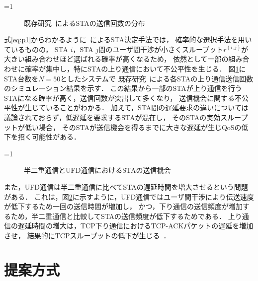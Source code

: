 \documentclass[master]{kuisthesis}		%
\newcommand{\sij}{(i,j)}
\newcommand{\rij}{r^{\sij}}
\newcounter{flagFig}
\begin{document}
			\par
			\ifnum\value{flagFig}=1 {\begin{figure}[htbp]
				\centering
				\caption{既存研究~\cite{promac}によるSTAの送信回数の分布}
				\label{fig:numtx}
			\end{figure}}\fi
			式\eqref{eq:p1}からわかるように~\cite{promac}によるSTA決定手法では，
			確率的な選択手法を用いているものの，
			STA $i$，STA $j$間のユーザ間干渉が小さくスループット$\rij$が大きい組み合わせほど選ばれる確率が高くなるため，
			依然として一部の組み合わせに確率が集中し，特にSTAの上り通信において不公平性を生じる．
			図\ref{fig:numtx}にSTA台数を$N=50$としたシステムで
			既存研究~\cite{promac}による各STAの上り通信送信回数のシミュレーション結果を示す．
			この結果から一部のSTAが上り通信を行うSTAになる確率が高く，送信回数が突出して多くなり，
			送信機会に関する不公平性が生じていることがわかる．
			加えて，STA間の遅延要求の違いについては議論されておらず，低遅延を要求するSTAが混在し，
			そのSTAの実効スループットが低い場合，
			そのSTAが送信機会を得るまでに大きな遅延が生じQoSの低下を招く可能性がある．
			\par
			\ifnum\value{flagFig}=1 {\begin{figure}[htbp]
				\centering
				\caption{半二重通信とUFD通信におけるSTAの送信機会}
				\label{fig:problem}
			\end{figure}}\fi
			また，UFD通信は半二重通信に比べてSTAの遅延時間を増大させるという問題がある．
			これは，図\ref{fig:problem}に示すように，UFD通信ではユーザ間干渉により伝送速度が低下するため一回の送信時間が増加し，
			かつ，下り通信の送信頻度が増加するため，半二重通信と比較してSTAの送信頻度が低下するためである．
			上り通信の遅延時間の増大は，TCP下り通信におけるTCP-ACKパケットの遅延を増加させ，
			結果的にTCPスループットの低下が生じる~\cite{rtt}．


\section{提案方式}
\end{document}
